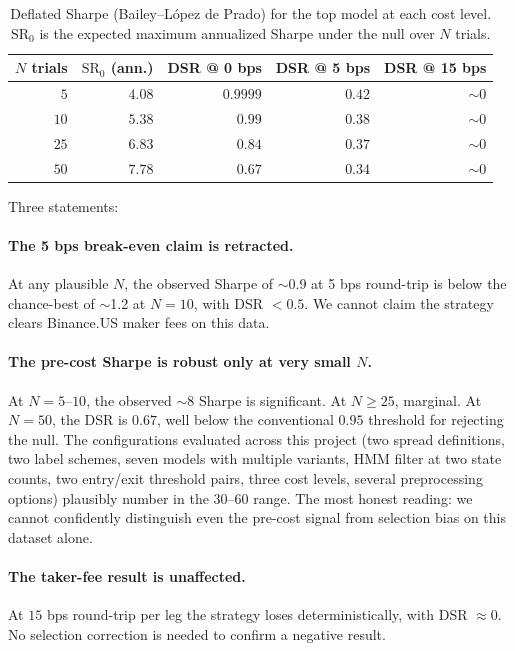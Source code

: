 \documentclass[11pt]{article}
\begin{document}
\begin{table}[h]
\centering
\caption{Deflated Sharpe (Bailey--L\'opez de Prado) for the top model
at each cost level. $\text{SR}_0$ is the expected maximum annualized
Sharpe under the null over $N$ trials.}
\label{tab:dsr}
\small
\begin{tabular}{rrrrr}
\toprule
$N$ trials & $\text{SR}_0$ (ann.) & DSR @ 0 bps & DSR @ 5 bps & DSR @ 15 bps \\
\midrule
$5$   & $4.08$ & $0.9999$ & $0.42$ & $\sim 0$ \\
$10$  & $5.38$ & $0.99$   & $0.38$ & $\sim 0$ \\
$25$  & $6.83$ & $0.84$   & $0.37$ & $\sim 0$ \\
$50$  & $7.78$ & $0.67$   & $0.34$ & $\sim 0$ \\
\bottomrule
\end{tabular}
\end{table}

Three statements:

\paragraph{The 5 bps break-even claim is retracted.} At any plausible
$N$, the observed Sharpe of $\sim$0.9 at 5 bps round-trip is below the
chance-best of $\sim$1.2 at $N = 10$, with DSR $< 0.5$. We cannot
claim the strategy clears Binance.US maker fees on this data.

\paragraph{The pre-cost Sharpe is robust only at very small $N$.} At
$N = 5$--$10$, the observed $\sim$8 Sharpe is significant. At
$N \geq 25$, marginal. At $N = 50$, the DSR is $0.67$, well below
the conventional $0.95$ threshold for rejecting the null. The
configurations evaluated across this project (two spread definitions,
two label schemes, seven models with multiple variants, HMM filter at
two state counts, two entry/exit threshold pairs, three cost levels,
several preprocessing options) plausibly number in the
$30$--$60$ range. The most honest reading: we cannot confidently
distinguish even the pre-cost signal from selection bias on this
dataset alone.

\paragraph{The taker-fee result is unaffected.} At $15$ bps round-trip
per leg the strategy loses deterministically, with DSR $\approx 0$.
No selection correction is needed to confirm a negative result.
\end{document}
